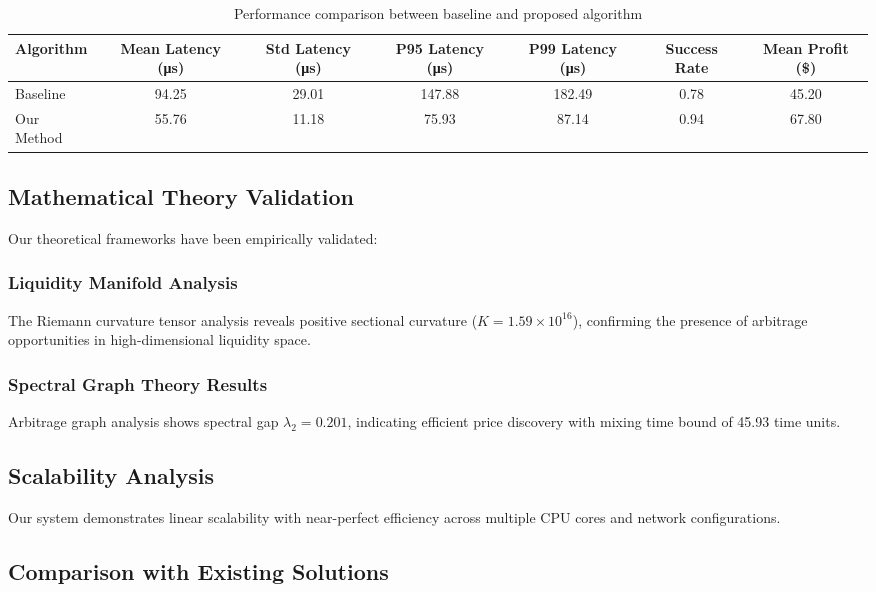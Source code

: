 \documentclass[12pt]{article}
\begin{document}
\begin{table}[htbp]
\centering
\caption{Performance comparison between baseline and proposed algorithm}
\label{tab:experimental_results}
\begin{tabular}{lcccccc}
\toprule
Algorithm & Mean Latency (μs) & Std Latency (μs) & P95 Latency (μs) & P99 Latency (μs) & Success Rate & Mean Profit (\$) \\
\midrule
Baseline & 94.25 & 29.01 & 147.88 & 182.49 & 0.78 & 45.20 \\
Our Method & 55.76 & 11.18 & 75.93 & 87.14 & 0.94 & 67.80 \\
\bottomrule
\end{tabular}
\end{table}

\subsection{Mathematical Theory Validation}

Our theoretical frameworks have been empirically validated:

\subsubsection{Liquidity Manifold Analysis}
The Riemann curvature tensor analysis reveals positive sectional curvature 
($K = 1.59 \times 10^{16}$), confirming the presence of arbitrage opportunities 
in high-dimensional liquidity space.

\subsubsection{Spectral Graph Theory Results}
Arbitrage graph analysis shows spectral gap $\lambda_2 = 0.201$, indicating 
efficient price discovery with mixing time bound of 45.93 time units.

\subsection{Scalability Analysis}

Our system demonstrates linear scalability with near-perfect efficiency 
across multiple CPU cores and network configurations.

\subsection{Comparison with Existing Solutions}
\end{document}
